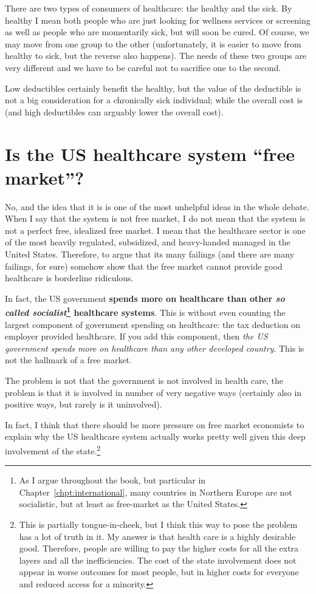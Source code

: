 There are two types of consumers of healthcare: the healthy and the sick. By
healthy I mean both people who are just looking for wellness services or
screening as well as people who are momentarily sick, but will soon be cured.
Of course, we may move from one group to the other (unfortunately, it is easier
to move from healthy to sick, but the reverse also happens). The needs of
these two groups are very different and we have to be careful not to sacrifice
one to the second.

Low deductibles certainly benefit the healthy, but the value of the deductible
is not a big consideration for a chronically sick individual; while the overall
cost is (and high deductibles can arguably lower the overall cost).

\section{Is the US healthcare system ``free market''?}

No, and the idea that it is is one of the most unhelpful ideas in the whole
debate. When I say that the system is not free market, I do not mean that the
system is not a perfect free, idealized free market. I mean that the healthcare
sector is one of the most heavily regulated, subsidized, and heavy-handed
managed in the United States. Therefore, to argue that its many failings (and
there are many failings, for sure) somehow show that the free market cannot
provide good healthcare is borderline ridiculous.

In fact, the US government \textbf{spends more on healthcare than other
\emph{so called socialist}\footnote{As I argue throughout the book, but
particular in Chapter~\ref{chpt:international}, many countries in Northern
Europe are not socialistic, but at least as free-market as the United States.}
healthcare systems}. This is without even counting the largest component of
government spending on healthcare: the tax deduction
on employer provided healthcare. If you add this component, then \emph{the US
government spends more on healthcare than any other developed country}. This is
not the hallmark of a free market. %

The problem is not that the government is not involved in health care, the
problem is that it is involved in number of very negative ways (certainly also
in positive ways, but rarely is it uninvolved).

In fact, I think that there should be more pressure on free market economists
to explain why the US healthcare system actually works pretty well given this
deep involvement of the state.\footnote{This is partially tongue-in-cheek, but
I think this way to pose the problem has a lot of truth in it. My answer is
that health care is a highly desirable good. Therefore, people are willing to
pay the higher costs for all the extra layers and all the inefficiencies. The
cost of the state involvement does not appear in worse outcomes for most
people, but in higher costs for everyone and reduced access for a minority.}

